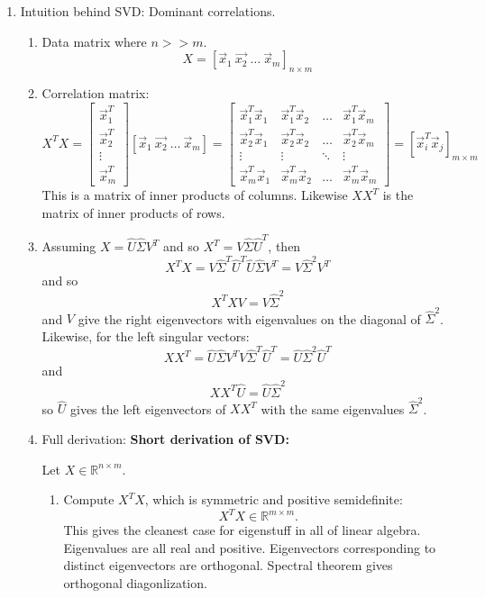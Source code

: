 \documentclass{article}
\begin{document}
\begin{enumerate}
\item Intuition behind SVD: Dominant correlations.
\begin{enumerate}
\item Data matrix where $n >> m$.
\[
X = \left[\vec{x}_1 ~ \vec{x_2} ~ \dots ~ \vec{x}_m \right]_{n \times m}
\] 
\item Correlation matrix:
\[
X^T X = \begin{bmatrix}
\vec{x}_1^T \\
\vec{x}_2^T \\
\vdots \\
\vec{x}_m^T 
\end{bmatrix}
\left[\vec{x}_1 ~ \vec{x_2} ~ \dots ~ \vec{x}_m \right]
= \begin{bmatrix}
\vec{x}_1^T \vec{x}_1 & \vec{x}_1^T \vec{x}_2 & \dots & \vec{x}_1^T \vec{x}_m \\
\vec{x}_2^T \vec{x}_1 & \vec{x}_2^T \vec{x}_2 & \dots & \vec{x}_2^T \vec{x}_m \\
\vdots & \vdots & \ddots & \vdots \\
\vec{x}_m^T \vec{x}_1 & \vec{x}_m^T \vec{x}_2 & \dots & \vec{x}_m^T \vec{x}_m
\end{bmatrix}
= \left[ \vec{x}_i^T \vec{x}_j\right]_{m \times m}
\]
This is a matrix of inner products of columns. Likewise $XX^T$ is the matrix of inner products of rows.
\item Assuming $X= \hat{U} \hat{\Sigma} V^T$ and so $X^T = V \hat{\Sigma}\hat{U}^T$, then
\[
X^T X = V \hat{\Sigma}^T \hat{U}^T \hat{U} \hat{\Sigma} V^T 
= V \hat{\Sigma}^2 V^T
\]
and so
\[
X^T X V = V \hat{\Sigma}^2
\]
and $V$ give the right eigenvectors with eigenvalues on the diagonal of $\hat{\Sigma}^2$. Likewise, for the left singular vectors:
\[
X X^T = \hat{U} \hat{\Sigma} V^T V \hat{\Sigma}^T \hat{U}^T = \hat{U} \hat{\Sigma}^2 \hat{U}^T
\]
and
\[
X X^T \hat{U} = \hat{U} \hat{\Sigma}^2
\]
so $\hat{U}$ gives the left eigenvectors of $X X^T$ with the same eigenvalues $\hat{\Sigma}^2$.

\item Full derivation:
\textbf{Short derivation of SVD:}

Let $X \in \mathbb{R}^{n \times m}$.

\begin{enumerate}
\item Compute $X^T X$, which is symmetric and positive semidefinite:
\[
X^T X \in \mathbb{R}^{m \times m}.
\]
This gives the cleanest case for eigenstuff in all of linear algebra. Eigenvalues are all real and positive. Eigenvectors corresponding to distinct eigenvectors are orthogonal. Spectral theorem gives orthogonal diagonlization.


\end{enumerate}
\end{enumerate}
\end{enumerate}
\end{document}

